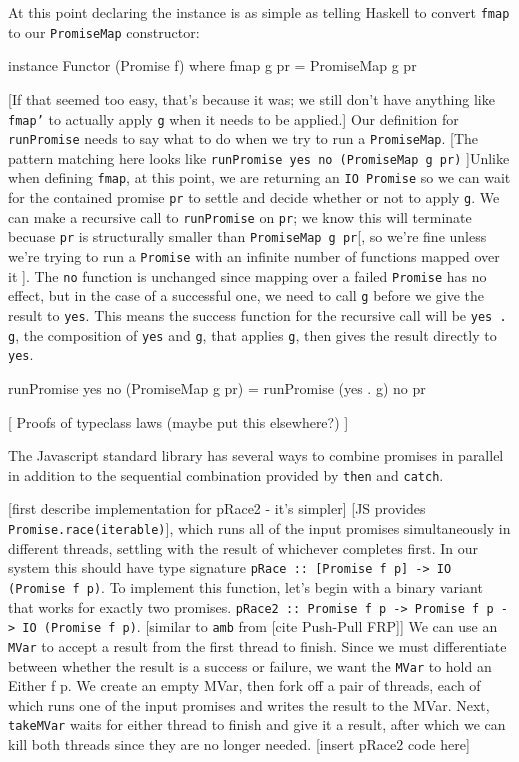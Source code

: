 \documentclass[12pt, english, letterpaper]{kuthesis}
\newcommand{\lit}[1]{\texttt{#1}}
\begin{document}
At this point declaring the instance is as simple as telling Haskell to convert \lit{fmap} to our \lit{PromiseMap} constructor:
\begin{code}
instance Functor (Promise f) where
    fmap g pr = PromiseMap g pr
\end{code}
[If that seemed too easy, that's because it was; we still don't have anything like \lit{fmap'} to actually apply \lit g when it needs to be applied.]  Our definition for \lit{runPromise} needs to say what to do when we try to run a \lit{PromiseMap}.  [The pattern matching here looks like \lit{runPromise yes no (PromiseMap g pr)} ]Unlike when defining \lit{fmap}, at this point, we are returning an \lit{IO Promise} so we can wait for the contained promise \lit{pr} to settle and decide whether or not to apply \lit g.  We can make a recursive call to \lit{runPromise} on \lit{pr}; we know this will terminate becuase \lit{pr} is structurally smaller than \lit{PromiseMap g pr}[, so we're fine unless we're trying to run a \lit{Promise} with an infinite number of functions mapped over it ].  The \lit{no} function is unchanged since mapping over a failed \lit{Promise} has no effect, but in the case of a successful one, we need to call \lit g before we give the result to \lit{yes}.  This means the success function for the recursive call will be \lit{yes . g}, the composition of \lit{yes} and \lit g, that applies \lit g, then gives the result directly to \lit{yes}.
\begin{code}
runPromise yes no (PromiseMap g pr) = runPromise (yes . g) no pr
\end{code}

[ Proofs of typeclass laws (maybe put this elsewhere?) ]

The Javascript standard library has several ways to combine promises in parallel in addition to the sequential combination provided by \lit{then} and \lit{catch}.

[first describe implementation for pRace2 - it's simpler]
[JS provides \lit{Promise.race(iterable)}], which runs all of the input promises simultaneously in different threads, settling with the result of whichever completes first.  In our system this should have type signature \lit{pRace :: [Promise f p] -> IO (Promise f p)}.  To implement this function, let's begin with a binary variant that works for exactly two promises.  \lit{pRace2 :: Promise f p -> Promise f p -> IO (Promise f p)}.  [similar to \lit {amb} from [cite Push-Pull FRP]]  We can use an \lit{MVar} to accept a result from the first thread to finish.  Since we must differentiate between whether the result is a success or failure, we want the \lit{MVar} to hold an {Either f p}.  We create an empty MVar, then fork off a pair of threads, each of which runs one of the input promises and writes the result to the MVar.  Next, \lit{takeMVar} waits for either thread to finish and give it a result, after which we can kill both threads since they are no longer needed.
[insert pRace2 code here]
\end{document}
